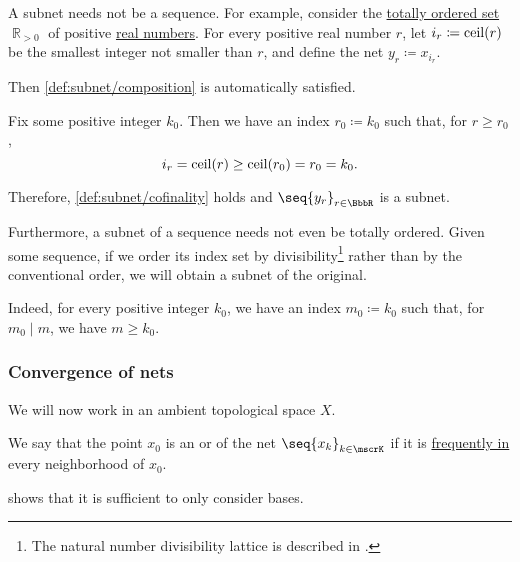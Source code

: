 \begin{example}
\begin{thmenum}
    A subnet needs not be a sequence. For example, consider the \hyperref[def:totally_ordered_set]{totally ordered set} \( \BbbR_{>0} \) of positive \hyperref[def:real_numbers]{real numbers}. For every positive real number \( r \), let \( i_r \coloneqq \operatorname{ceil}(r) \) be the smallest integer not smaller than \( r \), and define the net \( y_r \coloneqq x_{i_r} \).

    Then \ref{def:subnet/composition} is automatically satisfied.

    Fix some positive integer \( k_0 \). Then we have an index \( r_0 \coloneqq k_0 \) such that, for \( r \geq r_0 \),
    \begin{equation*}
      i_r = \operatorname{ceil}(r) \geq \operatorname{ceil}(r_0) = r_0 = k_0.
    \end{equation*}

    Therefore, \ref{def:subnet/cofinality} holds and \( \seq{ y_r }_{r \in \BbbR} \) is a subnet.

     Furthermore, a subnet of a sequence needs not even be totally ordered. Given some sequence, if we order its index set by divisibility\footnote{The natural number divisibility lattice is described in .} rather than by the conventional order, we will obtain a subnet of the original.

    Indeed, for every positive integer \( k_0 \), we have an index \( m_0 \coloneqq k_0 \) such that, for \( m_0 \mid m \), we have \( m \geq k_0 \).
  \end{thmenum}
\end{example}

\subsubsection{Convergence of nets}

We will now work in an ambient topological space \( X \).

\begin{definition}\label{def:net_cluster_point}
  We say that the point \( x_0 \) is an  or  of the net \( \seq{ x_k }_{k \in \mscrK} \) if it is \hyperref[def:net_frequently_in]{frequently in} every neighborhood of \( x_0 \).
\end{definition}
\begin{comments}
  \item {} shows that it is sufficient to only consider bases.
\end{comments}

